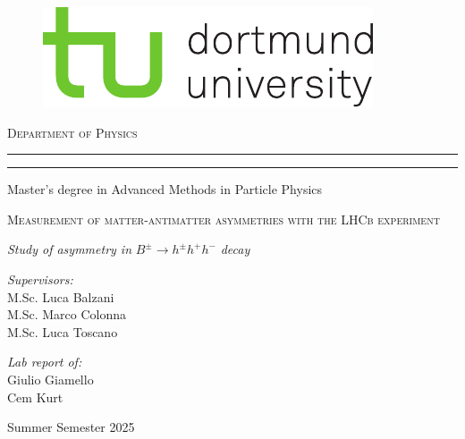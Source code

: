 \begin{titlepage}
	
	\begin{figure}[ht]
		\vspace{-0.5cm} %
		\begin{center}
			\includegraphics[scale=1.50]{tud_logos/logo_tud_english.pdf}
		\end{center}
	\end{figure}

    \vspace{15mm} %
	
	\begin{center}
		{{\large{\textsc{Department of Physics}}}}
		\rule[0.1cm]{\linewidth}{0.3mm} %
		\rule[0.5cm]{\linewidth}{0.3mm} %
		Master’s degree in Advanced Methods in Particle Physics
	\end{center}
	
	\vspace{25mm} %
	\begin{center}
		\begin{Large}
			\textsc{Measurement of matter-antimatter asymmetries with the LHCb experiment}
		\end{Large}
        
        \vspace{5mm} %
        \textit{Study of asymmetry in} $B^{ \pm} \rightarrow h^{ \pm} h^{+} h^{-}$ \textit{decay}
	\end{center}
    
	\vspace{35mm} %
	\noindent
	\begin{minipage}[t]{0.47\textwidth}
		{\large{\textit{Supervisors:}
        \\ M.Sc. Luca Balzani
        \\ M.Sc. Marco Colonna
        \\ M.Sc. Luca Toscano}}
	\end{minipage}
	\hfill
	\begin{minipage}[t]{0.47\textwidth}\raggedleft
		{\large{\textit{Lab report of:}
        \\ Giulio Giamello
        \\Cem Kurt}}
	\end{minipage}
	\vfill
	\vspace{15mm}
	\begin{center}
		{\large{Summer Semester 2025}}
	\end{center}
	\vspace{-2cm}
	
\end{titlepage}
